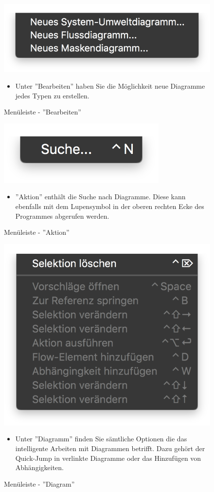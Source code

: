\begin{figure}[h!]
	\centering
	\includegraphics[width=.4\textwidth]{Leiste_Bearbeiten.png}
	\caption{Menüleiste - ''Bearbeiten''}
\begin{itemize}
\item Unter ''Bearbeiten'' haben Sie die Möglichkeit neue Diagramme jedes Typen zu erstellen.
\end{itemize}
\end{figure}


\begin{figure}[h!]
	\centering
	\includegraphics[width=.4\textwidth]{Leiste_Aktion.png}
	\caption{Menüleiste - ''Aktion''}
\begin{itemize}
\item ''Aktion'' enthält die Suche nach Diagramme. Diese kann ebenfalls mit dem Lupensymbol in der oberen rechten Ecke des Programmes abgerufen werden.
\end{itemize}
\end{figure}



\begin{figure}[h!]
	\centering
	\includegraphics[width=.4\textwidth]{Leiste_Diagram.png}
	\caption{Menüleiste - ''Diagram''}
\begin{itemize}
\item  Unter ''Diagramm'' finden Sie sämtliche Optionen die das intelligente Arbeiten mit Diagrammen betrifft. Dazu gehört der Quick-Jump in verlinkte Diagramme oder das Hinzufügen von Abhängigkeiten.
\end{itemize}
\end{figure}




